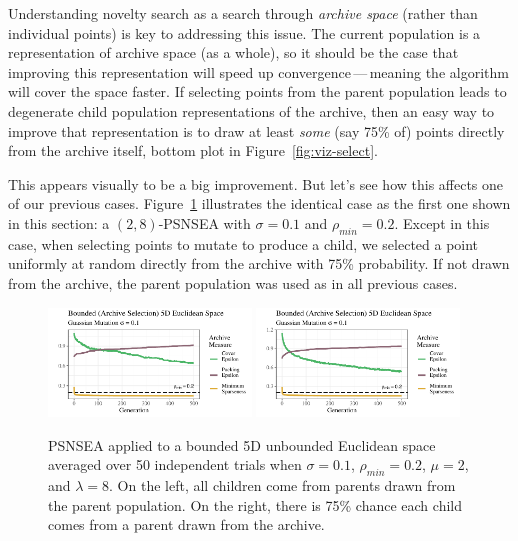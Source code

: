 \documentclass[twoside]{article}
\begin{document}
Understanding novelty search as a search through \emph{archive space} (rather than individual points) is key to addressing this issue.  The current population is a representation of archive space (as a whole), so it should be the case that improving this representation will speed up convergence\,---\,meaning the algorithm will cover the space faster.  If selecting points from the parent population leads to degenerate child population representations of the archive, then an easy way to improve that representation is to draw at least \emph{some} (say 75\% of) points directly from the archive itself, bottom plot in Figure~\ref{fig:viz-select}.   
%

This appears visually to be a big improvement.  But let's see how this affects one of our previous cases.  Figure~\ref{fig:bounded:viz:mu2lam8:0102} illustrates the identical case as the first one shown in this section:  a $(2,8)$-PSNSEA with $\sigma=0.1$ and $\rho_{min}=0.2$.  Except in this case, when selecting points to mutate to produce a child, we selected a point uniformly at random directly from the archive with 75\% probability.  If not drawn from the archive, the parent population was used as in all previous cases.
%
\begin{figure}[h]
  \includegraphics[width=0.48\textwidth]{Figures/bounded-500-s01r02-mu2lam8.pdf}
  \includegraphics[width=0.48\textwidth]{Figures/boundedrv-500-vizexamp-mu2lam8-full.pdf}
  \caption{\label{fig:bounded:viz:mu2lam8:0102} PSNSEA applied to a bounded 5D unbounded Euclidean space averaged over 50 independent trials when $\sigma=0.1$, $\rho_{min}=0.2$, $\mu=2$, and $\lambda=8$.  On the left, all children come from parents drawn from the parent population.  On the right, there is 75\% chance each child comes from a parent drawn from the archive.}
\end{figure}
\end{document}
